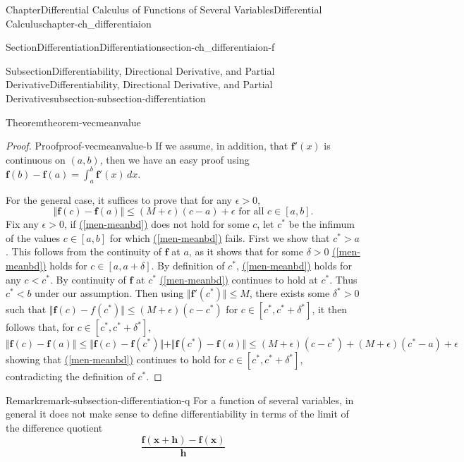 \documentclass[oneside,10pt,]{book}
\newcommand{\xreffont}{\relax}
\numberwithin{equation}{section}
\newcommand{\bff}{\mathbf{f}}
\newcommand{\lt}{<}
\newcommand{\gt}{>}
\begin{document}
\begin{chapterptx}{Chapter}{Differential Calculus of Functions of Several Variables}{}{Differential Calculus}{}{}{chapter-ch_differentiaion}
\begin{sectionptx}{Section}{Differentiation}{}{Differentiation}{}{}{section-ch_differentiaion-f}
\begin{subsectionptx}{Subsection}{Differentiability, Directional Derivative, and Partial Derivative}{}{Differentiability, Directional Derivative, and Partial Derivative}{}{}{subsection-subsection-differentiation}
\begin{theorem}{Theorem}{}{}{theorem-vecmeanvalue}
\end{theorem}
\begin{proof}{Proof}{}{proof-vecmeanvalue-b}
If we assume, in addition, that \(\bff'(x)\) is continuous on \((a,  b)\), then we have an easy proof using \(\bff(b)-\bff(a)=\int_{a}^{b}\bff'(x)\, dx\).%
\par
For the general case, it suffices to prove that for any \(\epsilon \gt 0\),%
\begin{equation}
\Vert\bff(c)-\bff(a)\Vert\le (M+\epsilon)(c-a) +\epsilon \text{ for all $c\in [a, b]$.}\label{men-meanbd}
\end{equation}
Fix any \(\epsilon \gt 0\), if \hyperref[men-meanbd]{({\xreffont\ref{men-meanbd}})} does not hold for some \(c\), let \(c^{*}\) be the infimum of the values \(c\in [a, b]\) for which \hyperref[men-meanbd]{({\xreffont\ref{men-meanbd}})} fails. First we show that \(c^{*}>a\). This follows from the continuity of \(\bff\) at \(a\), as it shows that for some \(\delta >0\)  \hyperref[men-meanbd]{({\xreffont\ref{men-meanbd}})} holds for \(c\in [a, a+\delta]\). By definition of \(c^{*}\), \hyperref[men-meanbd]{({\xreffont\ref{men-meanbd}})} holds for any \(c \lt c^{*}\). By continuity of \(\bff\) at \(c^{*}\) \hyperref[men-meanbd]{({\xreffont\ref{men-meanbd}})} continues to hold at \(c^{*}\). Thus \(c^{*}\lt b\) under our assumption. Then using \(\Vert\bff'(c^{*})\Vert\le M\), there exists some \(\delta^{*}>0\) such that \(\Vert \bff(c)-f(c^{*})\Vert\le (M+\epsilon)(c-c^{*})\) for \(c\in [c^{*}, c^{*}+\delta^{*}]\), it then follows that, for \(c\in [c^{*}, c^{*}+\delta^{*}]\),%
\begin{equation*}
\Vert\bff(c)-\bff(a)\Vert\le \Vert\bff(c)- \bff(c^{*})\Vert + \Vert\bff(c^{*})-\bff(a)\Vert\le (M+\epsilon)(c-c^{*}) + (M+\epsilon)(c^{*}-a) +\epsilon
\end{equation*}
showing that \hyperref[men-meanbd]{({\xreffont\ref{men-meanbd}})} continues to hold for \(c\in [c^{*}, c^{*}+\delta^{*}]\), contradicting the definition of \(c^{*}\).%
\end{proof}
\begin{remark}{Remark}{}{remark-subsection-differentiation-q}%
For a function of several variables, in general it does not make sense to define differentiability in terms of the limit of the difference quotient%
\begin{equation*}
\frac{ {\mathbf f}({\mathbf x}+{\mathbf h})- {\mathbf f}({\mathbf x})}{{\mathbf h}}
\end{equation*}

\end{remark}
\end{subsectionptx}
\end{sectionptx}
\end{chapterptx}
\end{document}
